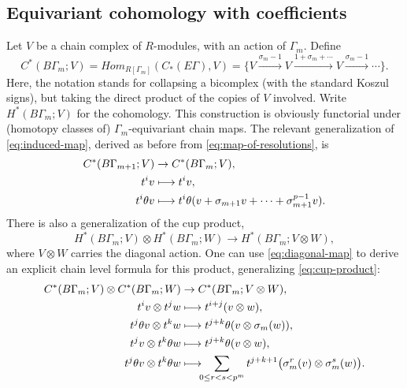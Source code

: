 \documentclass[JEP,XML,SOM,Unicode,NoFloatCountersInSection,published]{cedram}
\newcommand\mto{\mathchoice{\longmapsto}{\mapsto}{\mapsto}{\mapsto}}
\theoremstyle{plain}
\theoremstyle{definition}
\begin{document}
\subsection{Equivariant cohomology with coefficients}
Let $V$ be a chain complex of $R$-modules, with an action of $\Gamma_m$. Define
\begin{equation}\label{eq:v-coefficients}
C^*(B\Gamma_m;V) \!=\! \mathit{Hom}_{R[\Gamma_m]}(C_*(E\Gamma),V) \!=\! \bigl\{ V \xrightarrow{\sigma_m - 1} V \xrightarrow{1+\sigma_m + \cdots} V \xrightarrow{\sigma_m - 1} \cdots \bigr\}.
\end{equation}
Here, the notation stands for collapsing a bicomplex (with the standard Koszul signs), but taking the direct product of the copies of $V$ involved. Write $H^*(B\Gamma_m;V)$ for the cohomology. This construction is obviously functorial under (homotopy classes of) $\Gamma_m$-equivariant chain maps. The relevant generalization of \eqref{eq:induced-map}, derived as before from \eqref{eq:map-of-resolutions}, is
\begin{equation}\label{eq:induced-map-with-coefficients}
\begin{aligned}
C^*(B\Gamma_{m+1};V) &\to C^*(B\Gamma_m;V), \\
t^i v &\mto t^i v, \\
t^i\theta v &\mto t^i\theta (v + \sigma_{m+1} v + \cdots + \sigma_{m+1}^{p-1} v).
\end{aligned}
\end{equation}
There is also a generalization of the cup product,
\begin{equation*}
H^*(B\Gamma_m;V) \otimes H^*(B\Gamma_m;W) \to H^*(B\Gamma_m;V \otimes W),
\end{equation*}
where $V \otimes W$ carries the diagonal action. One can use \eqref{eq:diagonal-map} to derive an explicit chain level formula for this product, generalizing \eqref{eq:cup-product}:
\begin{equation}\label{eq:chain-cup-product-with-coefficients}
\begin{aligned}
C^*(B\Gamma_m;V) \otimes C^*(B\Gamma_m;W) &\to C^*(B\Gamma_m;V \otimes W), \\
t^i v \otimes t^j w &\mto t^{i+j} (v \otimes w), \\
t^j\theta v \otimes t^k w &\mto t^{j+k}\theta (v \otimes \sigma_m(w)), \\
t^j v \otimes t^k\theta w&\mto t^{j+k}\theta (v \otimes w), \\
t^j\theta v \otimes t^k\theta w &\mto \!\!\!\sum_{0 \leq r < s < p^m} t^{j+k+1}\bigl( \sigma_m^r(v) \otimes \sigma_m^s(w) \bigr).
\end{aligned}
\end{equation}
\end{document}
